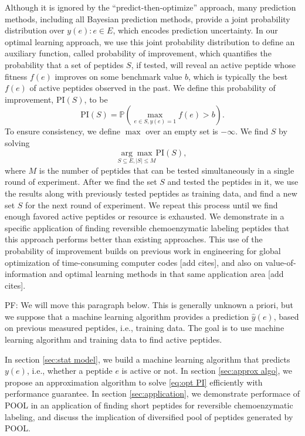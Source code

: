 \documentclass[11pt]{article}
\newcommand{\Prob}{\mathbb{P}}
\newcommand{\PI}{\text{PI}}
\newcommand{\pfcomment}[1]{\color{blue} PF: #1}
\begin{document}
Although it is ignored by the \enquote{predict-then-optimize} approach, many prediction methods, 
including all Bayesian prediction methods, provide a joint probability distribution over
$y(e): e \in E$, which encodes prediction uncertainty. In our optimal learning 
approach, we use this joint probability distribution to define an auxiliary 
function, called probability of improvement, which quantifies the probability 
that a set of peptides $S$, if tested, will reveal an active peptide whose fitness 
$f(e)$ improves on some benchmark value $b$, which is typically the best $f(e)$
of active peptides observed in the past. We define this probability of improvement, 
$\PI(S)$, to be
\begin{equation}
  \PI(S) = \Prob \left( \max_{e \in S, y(e)=1} f(e) > b \right).
  \label{}
\end{equation}
To ensure consistency, we define $\max$ over an empty set is $-\infty$.
We find $S$ by solving
\begin{equation}
  \underset{S \subseteq E, |S| \leq M}{\arg\max} \PI(S),
  \label{eq:opt PI}
\end{equation}
where $M$ is the number of peptides that can be tested simultaneously in a single round of experiment. 
After we find the set $S$ and tested the peptides in it, we use the results along with previously
tested peptides as training data, and find a new set $S$ for the next round of experiment. We repeat this
process until we find enough favored active peptides or resource is exhausted. We demonstrate
in a specific application of finding reversible chemoenzymatic labeling peptides
that this approach performs better than existing approaches.
This use of the probability of improvement builds on previous work in engineering 
for global optimization of time-consuming computer codes [add cites], and also on
value-of-information and optimal learning methods in that same application area 
[add cites].

\pfcomment{We will move this paragraph below.}
This is generally unknown a priori, but we suppose that a machine learning algorithm 
provides a prediction $\hat{y}(e)$, based on previous measured peptides, i.e., training data. 
The goal is to use machine learning algorithm and training data to find active peptides. 


In section \ref{sec:stat model}, we build a machine learning algorithm that predicts
$y(e)$, i.e., whether a peptide $e$ is active or not. In section \ref{sec:approx algo},
we propose an approximation algorithm to solve \eqref{eq:opt PI} efficiently with 
performance guarantee. In section \ref{sec:application}, we demonstrate performace
of POOL in an application of finding short peptides for reversible chemoenzymatic
labeling, and discuss the implication of diversified pool of peptides generated 
by POOL.
\end{document}
